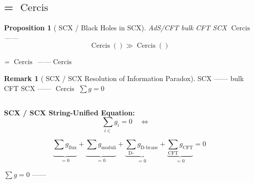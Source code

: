 \documentclass[12pt,a4paper]{article}
\theoremstyle{plain}
\newtheorem{proposition}[theorem]{ Proposition}
\theoremstyle{definition}
\newtheorem{remark}[theorem]{ Remark}
\DeclareMathOperator{\Cercis}{Cercis}
\begin{document}

\subsection{ =  $\Cercis$ }

\begin{proposition}[ SCX  / Black Holes in SCX]
 AdS/CFT bulk  CFT \textbf{}
 SCX \textbf{ $\Cercis$ }——
\begin{equation}
    \Cercis(\text{}) \gg \Cercis(\text{})
\end{equation}

 = $\Cercis$ ——$\Cercis$ 

\end{proposition}

\begin{remark}[ SCX  / SCX Resolution of Information Paradox]


SCX ——\textbf{}
bulk  CFT 
 SCX \textbf{}——
 $\Cercis$ 
$\sum g = 0$ 
\end{remark}


\subsection{}

\begin{keyeq}
\textbf{SCX  / SCX String-Unified Equation:}
\begin{equation}
    \boxed{
    \sum_{i \in \text{}} g_i = 0
    \quad \Longleftrightarrow \quad
    \text{}
    }
\end{equation}

\textbf{}
\begin{equation}
    \underbrace{\sum_{\text{}} g_{\text{flux}}}_{=0}
    + \underbrace{\sum_{\text{}} g_{\text{moduli}}}_{=0}
    + \underbrace{\sum_{\text{D-}} g_{\text{D-brane}}}_{=0}
    + \underbrace{\sum_{\text{CFT}} g_{\text{CFT}}}_{=0}
    = 0
\end{equation}

 $\sum g = 0$ ——\textbf{}
\end{keyeq}
\end{document}
